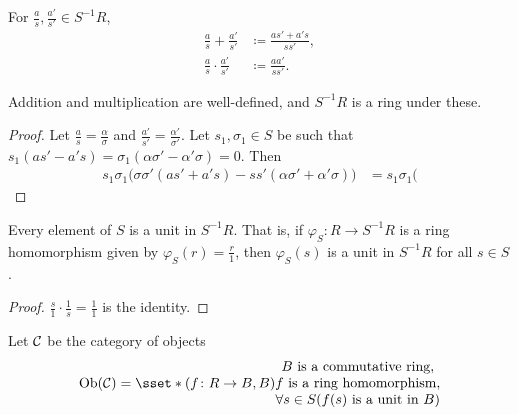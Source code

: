 \begin{definition}
    For $\frac as, \frac{a'}{s'} \in S^{-1}R$, \begin{align*}
        \frac as + \frac{a'}{s'} &\coloneq \frac{as' + a's}{ss'}, \\
        \frac as \cdot \frac{a'}{s'} &\coloneq \frac{aa'}{ss'}.
    \end{align*}
\end{definition}
\begin{exercise}
    Addition and multiplication are well-defined,
    and $S^{-1}R$ is a ring under these.
\end{exercise}
\begin{proof}
    Let $\frac as = \frac \alpha\sigma$ and
    $\frac{a'}{s'} = \frac{\alpha'}{\sigma'}$.
    Let $s_1, \sigma_1 \in S$ be such that
    $s_1(as' - a's) = \sigma_1(\alpha\sigma' - \alpha'\sigma) = 0$.
    Then \begin{align*}
        s_1\sigma_1\big(\sigma\sigma'(as' + a's)
        - ss'(\alpha\sigma' + \alpha'\sigma)\big)
            &= s_1\sigma_1\big(
    \end{align*}
\end{proof}

\begin{proposition} \label{prp:inv}
    Every element of $S$ is a unit in $S^{-1}R$.
    That is, if $\varphi_S \colon R \to S^{-1}R$ is a ring homomorphism
    given by $\varphi_S(r) = \frac r1$, then $\varphi_S(s)$ is a unit in
    $S^{-1}R$ for all $s \in S$.
\end{proposition}
\begin{proof}
    $\frac s1 \cdot \frac 1s = \frac 11$ is the identity.
\end{proof}

Let $\mathcal{C}$ be the category of objects \[
    \Ob(\mcC) = \sset*{(f\colon R \to B, B)}{\begin{matrix}
        B \text{ is a commutative ring}, \\
        f \text{ is a ring homomorphism}, \\
        \forall s \in S (f(s) \text{ is a unit in } B)
    \end{matrix}}
\]


